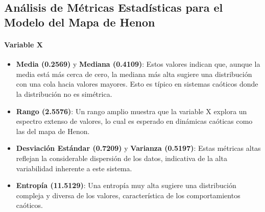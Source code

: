 \documentclass[11pt]{article}
\begin{document}
    \begin{center}
    \end{center}
    { \hspace*{\fill} \\}
    
    \begin{center}
    \end{center}
    { \hspace*{\fill} \\}
    
    \hypertarget{anuxe1lisis-de-muxe9tricas-estaduxedsticas-para-el-modelo-del-mapa-de-henon}{%
\subsection{Análisis de Métricas Estadísticas para el Modelo del Mapa de
Henon}\label{anuxe1lisis-de-muxe9tricas-estaduxedsticas-para-el-modelo-del-mapa-de-henon}}

\hypertarget{variable-x}{%
\paragraph{Variable X}\label{variable-x}}

\begin{itemize}
\item
  \textbf{Media (0.2569)} y \textbf{Mediana (0.4109)}: Estos valores
  indican que, aunque la media está más cerca de cero, la mediana más
  alta sugiere una distribución con una cola hacia valores mayores. Esto
  es típico en sistemas caóticos donde la distribución no es simétrica.
\item
  \textbf{Rango (2.5576)}: Un rango amplio muestra que la variable X
  explora un espectro extenso de valores, lo cual es esperado en
  dinámicas caóticas como las del mapa de Henon.
\item
  \textbf{Desviación Estándar (0.7209)} y \textbf{Varianza (0.5197)}:
  Estas métricas altas reflejan la considerable dispersión de los datos,
  indicativa de la alta variabilidad inherente a este sistema.
\item
  \textbf{Entropía (11.5129)}: Una entropía muy alta sugiere una
  distribución compleja y diversa de los valores, característica de los
  comportamientos caóticos.
\end{itemize}
\end{document}
